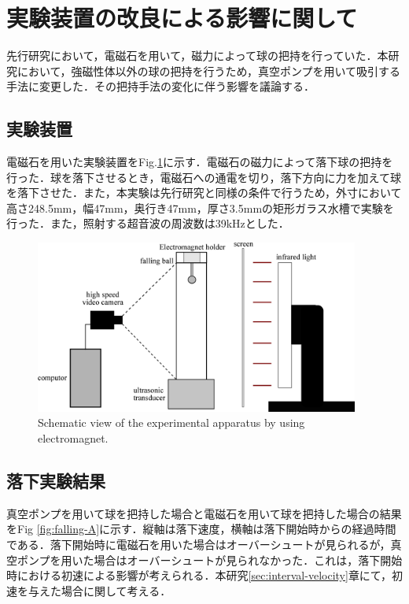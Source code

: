 \section{実験装置の改良による影響に関して}
\label{sec:reexp}
先行研究\cite{ref:8}において，電磁石を用いて，磁力によって球の把持を行っていた．本研究において，強磁性体以外の球の把持を行うため，真空ポンプを用いて吸引する手法に変更した．その把持手法の変化に伴う影響を議論する．

\subsection{実験装置}

電磁石を用いた実験装置をFig.\ref{fig:magnet_device}に示す．電磁石の磁力によって落下球の把持を行った．球を落下させるとき，電磁石への通電を切り，落下方向に力を加えて球を落下させた．また，本実験は先行研究と同様の条件で行うため，外寸において高さ248.5mm，幅47mm，奥行き47mm，厚さ3.5mmの矩形ガラス水槽で実験を行った．また，照射する超音波の周波数は39kHzとした．

\begin{figure}[H]
    \centering
    \includegraphics[width=0.95\textwidth]{X-Appendix/device/magnet_device.eps}
    \caption{Schematic view of the experimental apparatus by using electromagnet.}
    \label{fig:magnet_device}
\end{figure}

\subsection{落下実験結果}
真空ポンプを用いて球を把持した場合と電磁石を用いて球を把持した場合の結果をFig \ref{fig:falling-A}に示す．縦軸は落下速度，横軸は落下開始時からの経過時間である．落下開始時に電磁石を用いた場合はオーバーシュートが見られるが，真空ポンプを用いた場合はオーバーシュートが見られなかった．これは，落下開始時における初速による影響が考えられる．本研究\ref{sec:interval-velocity}章にて，初速を与えた場合に関して考える．

